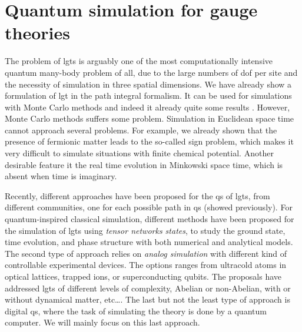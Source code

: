 \section{Quantum simulation for gauge theories}
\label{sec:quantum_simulation_for_gauge_theories}


The problem of \ac{lgt}s is arguably one of the most computationally intensive quantum many-body problem of all, due to the large numbers of \ac{dof} per site and the necessity of simulation in three spatial dimensions.
We have already show a formulation of \ac{lgt} in the path integral formalism.
It can be used for simulations with Monte Carlo methods and indeed it already quite some results \citneeded.
However, Monte Carlo methods suffers some problem.
Simulation in Euclidean space time cannot approach several problems.
For example, we already shown that the presence of fermionic matter leads to the so-called sign problem, which makes it very difficult to simulate situations with finite chemical potential.
Another desirable feature it the real time evolution in Minkowski space time, which is absent when time is imaginary.

Recently, different approaches have been proposed for the \ac{qs} of \ac{lgt}s, from different communities, one for each possible path in \ac{qs} (showed previously).
For quantum-inspired classical simulation, different methods have been proposed for the simulation of \ac{lgt}s using \emph{tensor networks states}, to study the ground state, time evolution, and phase structure with both numerical and analytical models.
The second type of approach relies on \emph{analog simulation} with different kind of controllable experimental devices.
The options ranges from ultracold atoms in optical lattices\citneeded, trapped ions\citneeded, or superconducting qubits\citneeded.
The proposals have addressed \ac{lgt}s of different levels of complexity, Abelian or non-Abelian, with or without dynamical matter, etc\dots.
The last but not the least type of approach is digital \ac{qs}, where the task of simulating the theory is done by a quantum computer.
We will mainly focus on this last approach.

